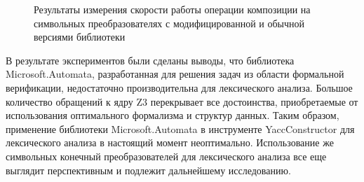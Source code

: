 \begin{figure}[H]
\begin{center}
\end{center}
\caption{Результаты измерения скорости работы операции композиции на символьных преобразователях с модифицированной и обычной версиями библиотеки}
\label{graph2}
\end{figure}

В результате экспериментов были сделаны выводы, что библиотека Microsoft.Automata, разработанная для решения задач из области формальной верификации, недостаточно производительна для лексического анализа. Большое количество обращений к ядру Z3 перекрывает все достоинства, приобретаемые от использования оптимального формализма и структур данных. Таким образом, применение библиотеки Microsoft.Automata в инструменте YaccConstructor для лексического анализа в настоящий момент неоптимально. 
Использование же символьных конечный преобразователей для лексического анализа все еще выглядит перспективным и подлежит дальнейшему исследованию.
